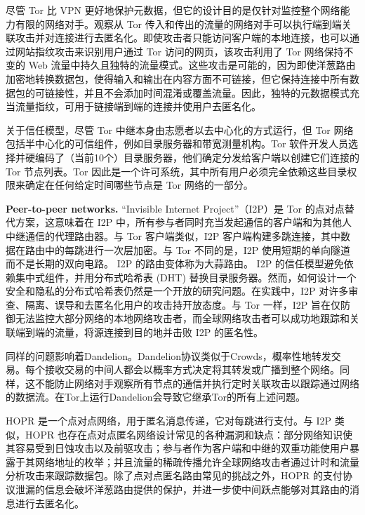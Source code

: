 \documentclass{article}
\begin{document}
	尽管 Tor 比 VPN 更好地保护元数据，但它的设计目的是仅针对监控整个网络能力有限的网络对手。观察从 Tor 传入和传出的流量的网络对手可以执行端到端关联攻击并对连接进行去匿名化\cite{ref62, ref71, ref83, ref96, ref97}。即使攻击者只能访问客户端的本地连接，也可以通过网站指纹攻击来识别用户通过 Tor 访问的网页，该攻击利用了 Tor 网络保持不变的 Web 流量中持久且独特的流量模式\cite{ref63, ref84}。这些攻击是可能的，因为即使洋葱路由加密地转换数据包，使得输入和输出在内容方面不可链接，但它保持连接中所有数据包的可链接性，并且不会添加时间混淆或覆盖流量。因此，独特的元数据模式充当流量指纹，可用于链接端到端的连接并使用户去匿名化。\newline

	关于信任模型，尽管 Tor 中继本身由志愿者以去中心化的方式运行，但 Tor 网络包括半中心化的可信组件，例如目录服务器和带宽测量机构。Tor 软件开发人员选择并硬编码了（当前10个）目录服务器，他们确定分发给客户端以创建它们连接的 Tor 节点列表。Tor 因此是一个许可系统，其中所有用户必须完全依赖这些目录权限来确定在任何给定时间哪些节点是 Tor 网络的一部分。\newline

	\textbf{Peer-to-peer networks.} “Invisible Internet Project”（I2P）是 Tor 的点对点替代方案，这意味着在 I2P 中，所有参与者同时充当发起通信的客户端和为其他人中继通信的代理路由器\cite{ref58}。与 Tor 客户端类似，I2P 客户端构建多跳连接，其中数据在路由中的每跳进行一次层加密。与 Tor 不同的是，I2P 使用短期的单向隧道而不是长期的双向电路。 I2P 的路由变体称为大蒜路由。 I2P 的信任模型避免依赖集中式组件，并用分布式哈希表 (DHT) 替换目录服务器。然而，如何设计一个安全和隐私的分布式哈希表仍然是一个开放的研究问题\cite{ref102}。在实践中，I2P 对许多审查、隔离、误导和去匿名化用户的攻击持开放态度\cite{ref45, ref54, ref55, ref61}。与 Tor 一样，I2P 旨在仅防御无法监控大部分网络的本地网络攻击者，而全球网络攻击者可以成功地跟踪和关联端到端的流量，将源连接到目的地并击败 I2P 的匿名性。\newline

	同样的问题影响着Dandelion\cite{ref8}。Dandelion协议类似于Crowds\cite{ref90}，概率性地转发交易。每个接收交易的中间人都会以概率方式决定将其转发或广播到整个网络。同样，这不能防止网络对手观察所有节点的通信并执行定时关联攻击以跟踪通过网络的数据流。在Tor上运行Dandelion会导致它继承Tor的所有上述问题\cite{ref46}。\newline

	HOPR 是一个点对点网络，用于匿名消息传递，它对每跳进行支付\cite{ref56}。与 I2P 类似，HOPR 也存在点对点匿名网络设计常见的各种漏洞和缺点：部分网络知识使其容易受到日蚀攻击\cite{ref99, ref100}以及前驱攻击\cite{ref104}；参与者作为客户端和中继的双重功能使用户暴露于其网络地址的枚举；并且流量的稀疏传播允许全球网络攻击者通过计时和流量分析攻击来跟踪数据包。除了点对点匿名路由常见的挑战之外，HOPR 的支付协议泄漏的信息会破坏洋葱路由提供的保护，并进一步使中间跃点能够对其路由的消息进行去匿名化\cite{ref91}。\newline
\end{document}
